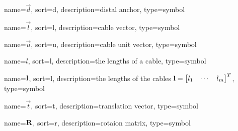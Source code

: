 	{%
		name=\ensuremath{\vec{d}},
		sort=d,
		description=distal anchor,
		type=symbol
	}
	\newcommand{\distalanchor}{\gls{sym:distalanchor}}

	{%
		name=\ensuremath{\vec{l}},
		sort=l,
		description=cable vector,
		type=symbol
	}
	\newcommand{\cablevec}{\gls{sym:cablevec}}

	{%
		name=\ensuremath{\vec{u}},
		sort=u,
		description=cable unit vector,
		type=symbol
	}
	\newcommand{\cableuvec}{\gls{sym:cableuvec}}

	{%
		name=\ensuremath{l},
		sort=l,
		description=the lengths of a cable,
		type=symbol
	}
	\newcommand{\cablelength}{\gls{sym:cablelength}}

	{%
		name=\ensuremath{\mat{l}},
		sort=l,
		description=the lengths of the cables \ensuremath{\mat{l} = {\left[\begin{matrix}l_1 & \cdots & l_m \end{matrix}\right]}^T},
		type=symbol
	}
	\newcommand{\cablelengths}{\gls{sym:cablelengths}}

	{%
		name=\ensuremath{\vec{t}},
		sort=t,
		description=translation vector,
		type=symbol
	}
	\newcommand{\transvec}{\gls{sym:transvec}}

	{%
		name=\ensuremath{\mat{R}},
		sort=r,
		description=rotaion matrix,
		type=symbol
	}
	\newcommand{\rotmatbare}{\gls{sym:rotmat}}
	\newcommand{\rotmat}[2]{{\project{\rotmatbare}{#1}}_{#2}}

